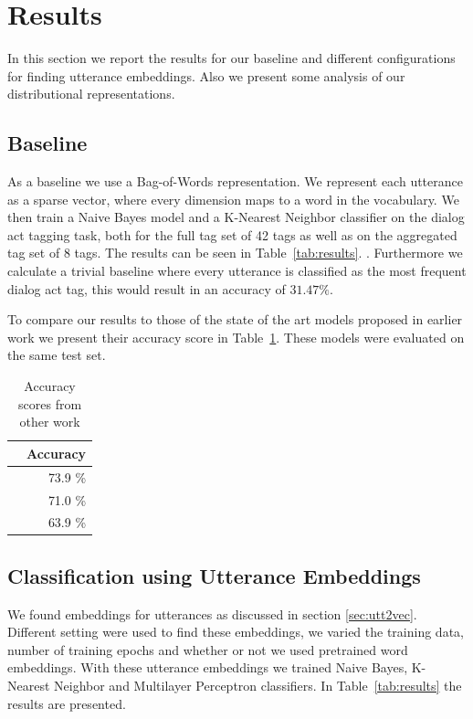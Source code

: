 \section{Results}\label{sec:results}
In this section we report the results for our baseline and different configurations for finding utterance embeddings.
Also we present some analysis of our distributional representations.

\subsection{Baseline}
As a baseline we use a Bag-of-Words representation.
We represent each utterance as a sparse vector, where every dimension maps to a word in the vocabulary.
We then train a Naive Bayes model and a K-Nearest Neighbor classifier on the dialog act tagging task, both for the full tag set of 42 tags as well as on the aggregated tag set of 8 tags.
The results can be seen in Table~\ref{tab:results}. .
Furthermore we calculate a trivial baseline where every utterance is classified as the most frequent dialog act tag, this would result in an accuracy of $31.47\%$.

To compare our results to those of the state of the art models proposed in earlier work we present their accuracy score in Table~\ref{tab:sota}. These models were evaluated on the same test set.
\begin{table}[t]
	\centering
	\begin{tabular}{l|r}
		& \textbf{Accuracy} \\ \hline
		\newcite{kalchbrenner} & 73.9 \%           \\
		\newcite{stolcke2000}  & 71.0 \%           \\
		\newcite{milajevs}     & 63.9 \%          
	\end{tabular}
		\caption{Accuracy scores from other work}
		\label{tab:sota}
\end{table}

\subsection{Classification using Utterance Embeddings}
We found embeddings for utterances as discussed in section \ref{sec:utt2vec}.
Different setting were used to find these embeddings, we varied the training data, number of training epochs and whether or not we used pretrained word embeddings.
With these utterance embeddings we trained Naive Bayes, K-Nearest Neighbor and Multilayer Perceptron classifiers.
In Table~\ref{tab:results} the results are presented. 

